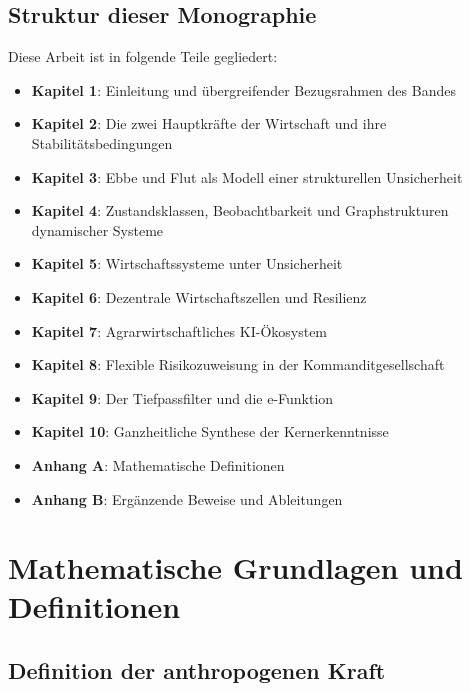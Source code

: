 \documentclass[a4paper, 12pt, twoside, openright]{report}
\theoremstyle{definition}
\theoremstyle{definition}
\begin{document}
\subsection{Struktur dieser Monographie}

Diese Arbeit ist in folgende Teile gegliedert:

\begin{itemize}
  \item \textbf{Kapitel 1}: Einleitung und übergreifender Bezugsrahmen des Bandes
  \item \textbf{Kapitel 2}: Die zwei Hauptkräfte der Wirtschaft und ihre Stabilitätsbedingungen
  \item \textbf{Kapitel 3}: Ebbe und Flut als Modell einer strukturellen Unsicherheit
  \item \textbf{Kapitel 4}: Zustandsklassen, Beobachtbarkeit und Graphstrukturen dynamischer Systeme
  \item \textbf{Kapitel 5}: Wirtschaftssysteme unter Unsicherheit
  \item \textbf{Kapitel 6}: Dezentrale Wirtschaftszellen und Resilienz
  \item \textbf{Kapitel 7}: Agrarwirtschaftliches KI-Ökosystem
  \item \textbf{Kapitel 8}: Flexible Risikozuweisung in der Kommanditgesellschaft
  \item \textbf{Kapitel 9}: Der Tiefpassfilter und die e-Funktion
  \item \textbf{Kapitel 10}: Ganzheitliche Synthese der Kernerkenntnisse
  \item \textbf{Anhang A}: Mathematische Definitionen
  \item \textbf{Anhang B}: Ergänzende Beweise und Ableitungen
\end{itemize}

\section{Mathematische Grundlagen und Definitionen}

\subsection{Definition der anthropogenen Kraft}
\end{document}
